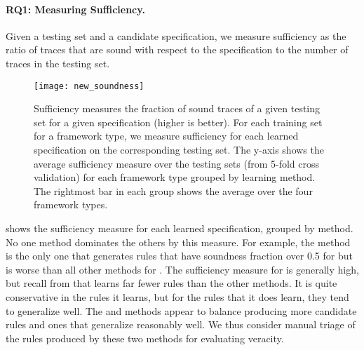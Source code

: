 \documentclass[10pt,reprint,nocopyrightspace,numbers]{sigplanconf}
\begin{document}
\paragraph{RQ1: Measuring Sufficiency.}

Given a testing set and a candidate specification, we measure sufficiency as the ratio of traces that are sound with respect to the specification to the number of traces in the testing set.

\begin{figure}\centering
  \texttt{[image: new\_soundness]}
\caption{Sufficiency measures the fraction of sound traces of a given testing set for a given specification (higher is better).
For each training set for a framework type, we measure sufficiency for each learned specification on the corresponding testing set.
The y-axis shows the average sufficiency measure over the testing sets (from 5-fold cross validation) for each framework type grouped by learning method. The rightmost bar in each group shows the average over the four framework types.}
 \label{fig:soundnessres}
\end{figure}

 shows the sufficiency measure for each learned specification, grouped by method. No one method dominates the others by this measure. For example, the \pfsa{} method is the only one that generates rules that have soundness fraction over 0.5 for \FragmentBench{} but is worse than all other methods for \AsyncTaskBench{}.
The sufficiency measure for  is generally high, but recall from  that  learns far fewer rules than the other methods. It is quite conservative in the rules it learns, but for the rules that it does learn, they tend to generalize well.
The  and \pfsa methods appear to balance producing more candidate rules and ones that generalize reasonably well. We thus consider manual triage of the rules produced by these two methods for evaluating veracity.

\end{document}
